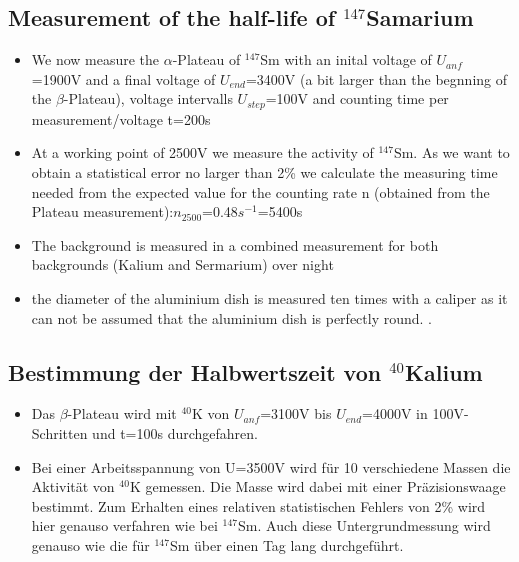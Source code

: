 \documentclass[12pt]{article}
\begin{document}
\subsection{Measurement of the half-life of ${}^{147}$Samarium}

\begin{itemize}
	
	\item We now measure the $\alpha$-Plateau of ${}^{147}$Sm with an inital voltage of $U_{anf}$=1900V and a final voltage of $U_{end}$=3400V (a bit larger than the begnning of the $\beta$-Plateau), voltage intervalls $U_{step}$=100V and counting time per measurement/voltage t=200s
	
	\item At a working point of 2500V we measure the activity of ${}^{147}$Sm.
      As we want to obtain a statistical error no larger than 2\% we calculate the measuring time needed from the expected value for the counting rate n (obtained from the Plateau measurement):$n_{2500}$=0.48$s^{-1}$=5400s
      
    \item The background is measured in a combined measurement for both backgrounds (Kalium and Sermarium) over night 
    
    \item the diameter of the aluminium dish is measured ten times with a caliper as it can not be assumed that the aluminium dish is perfectly round. 
.
\end{itemize}

\subsection{Bestimmung der Halbwertszeit von ${}^{40}$Kalium}

\begin{itemize}
	\item Das $\beta$-Plateau wird mit ${}^{40}$K von $U_{anf}$=3100V bis $U_{end}$=4000V in 100V-Schritten und t=100s durchgefahren.
	
	\item Bei einer Arbeitsspannung von U=3500V wird für 10 verschiedene Massen die Aktivität von ${}^{40}$K gemessen. Die Masse wird dabei mit einer Präzisionswaage bestimmt. Zum Erhalten eines relativen statistischen Fehlers von 2\% wird hier genauso verfahren wie bei ${}^{147}$Sm. Auch diese Untergrundmessung wird genauso wie die für ${}^{147}$Sm über einen Tag lang durchgeführt.
\end{itemize}
\end{document}
